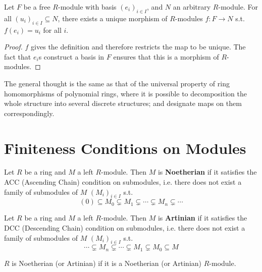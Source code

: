 \begin{theorem}\label{thm:Universal Property of Free Modules}
    Let $F$ be a free $R$-module with basis $(e_i)_{i\in I}$, and $N$ an arbitrary $R$-module. For all $(u_i)_{i\in I} \subseteq N$, there exists a unique morphism of $R$-modules $f: F\to N$ s.t. $f(e_i) = u_i$ for all $i$.
\end{theorem}

\begin{proof}
    $f$ gives the definition and therefore restricts the map to be unique. The fact that $e_i$s construct a basis in $F$ ensures that this is a morphism of $R$-modules. 
\end{proof}

\begin{remark}
    The general thought is the same as that of the universal property of ring homomorphisms of polynomial rings, where it is possible to decomposition the whole structure into several discrete structures; and designate maps on them correspondingly.
\end{remark}

\section{Finiteness Conditions on Modules}

\begin{definition}
    Let $R$ be a ring and $M$ a left $R$-module. Then $M$ is \textbf{Noetherian} if it satisfies the ACC (Ascending Chain) condition on submodules, i.e. there does not exist a family of submodules of $M$ $(M_i)_{i\in I}$ s.t. 
    \[
        (0)\subseteq M_0 \subsetneq M_1 \subsetneq \cdots \subsetneq M_n \subsetneq \cdots
    \]    
\end{definition}
    
\begin{definition}
    Let $R$ be a ring and $M$ a left $R$-module. Then $M$ is \textbf{Artinian} if it satisfies the DCC (Descending Chain) condition on submodules, i.e. there does not exist a family of submodules of $M$ $(M_i)_{i\in I}$ s.t.
    \[
        \cdots \subsetneq M_n \subsetneq \cdots \subsetneq M_1 \subsetneq M_0 \subseteq M
    \]
\end{definition}

\begin{remark}
    $R$ is Noetherian (or Artinian) if it is a Noetherian (or Artinian) $R$-module. 
\end{remark}

